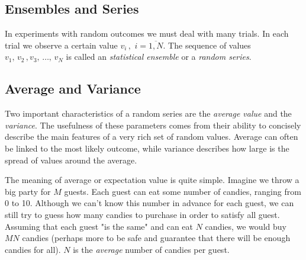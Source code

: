 \subsection{Ensembles and Series}
In experiments with random outcomes we must deal with many trials. In each trial we observe a certain value $v_i\,,\,\, i=\overline{1,N}$. The sequence of values $v_1,\,v_2\,,v_3,\,\ldots,\,v_N$ is called an \emph{statistical ensemble} or a \emph{random series}.


\subsection{Average and Variance}
Two important characteristics of a random series are the \emph{average value} and the \emph{variance}. The usefulness of these parameters comes from their ability to concisely describe the main features of a very rich set of random values. Average can often be linked to the most likely outcome, while variance describes how large is the spread of values around the average. 

The meaning of average or expectation value is quite simple. Imagine we throw a big party for $M$ guests. Each guest can eat some number of candies, ranging from 0 to 10. Although we can't know this number in advance for each guest, we can still try to guess how many candies to purchase in order to satisfy all guest. Assuming that each guest "is the same" and can eat $N$ candies, we would buy $MN$ candies (perhaps more to be safe and guarantee that there will be enough candies for all). $N$ is the \emph{average} number of candies per guest. 

